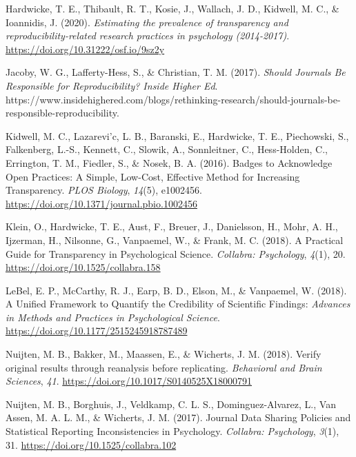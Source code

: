\documentclass[english,,man,floatsintext]{apa6}
\begin{document}
\leavevmode\hypertarget{ref-hardwicke2020a}{}%
Hardwicke, T. E., Thibault, R. T., Kosie, J., Wallach, J. D., Kidwell, M. C., \& Ioannidis, J. (2020). \emph{Estimating the prevalence of transparency and reproducibility-related research practices in psychology (2014-2017)}. \url{https://doi.org/10.31222/osf.io/9sz2y}

\leavevmode\hypertarget{ref-jacoby2017}{}%
Jacoby, W. G., Lafferty-Hess, S., \& Christian, T. M. (2017). \emph{Should Journals Be Responsible for Reproducibility? \textbar{} Inside Higher Ed}. https://www.insidehighered.com/blogs/rethinking-research/should-journals-be-responsible-reproducibility.

\leavevmode\hypertarget{ref-kidwell2016}{}%
Kidwell, M. C., Lazarevi\a'c, L. B., Baranski, E., Hardwicke, T. E., Piechowski, S., Falkenberg, L.-S., Kennett, C., Slowik, A., Sonnleitner, C., Hess-Holden, C., Errington, T. M., Fiedler, S., \& Nosek, B. A. (2016). Badges to Acknowledge Open Practices: A Simple, Low-Cost, Effective Method for Increasing Transparency. \emph{PLOS Biology}, \emph{14}(5), e1002456. \url{https://doi.org/10.1371/journal.pbio.1002456}

\leavevmode\hypertarget{ref-klein2018}{}%
Klein, O., Hardwicke, T. E., Aust, F., Breuer, J., Danielsson, H., Mohr, A. H., Ijzerman, H., Nilsonne, G., Vanpaemel, W., \& Frank, M. C. (2018). A Practical Guide for Transparency in Psychological Science. \emph{Collabra: Psychology}, \emph{4}(1), 20. \url{https://doi.org/10.1525/collabra.158}

\leavevmode\hypertarget{ref-lebel2018}{}%
LeBel, E. P., McCarthy, R. J., Earp, B. D., Elson, M., \& Vanpaemel, W. (2018). A Unified Framework to Quantify the Credibility of Scientific Findings: \emph{Advances in Methods and Practices in Psychological Science}. \url{https://doi.org/10.1177/2515245918787489}

\leavevmode\hypertarget{ref-nuijten2018}{}%
Nuijten, M. B., Bakker, M., Maassen, E., \& Wicherts, J. M. (2018). Verify original results through reanalysis before replicating. \emph{Behavioral and Brain Sciences}, \emph{41}. \url{https://doi.org/10.1017/S0140525X18000791}

\leavevmode\hypertarget{ref-nuijten2017}{}%
Nuijten, M. B., Borghuis, J., Veldkamp, C. L. S., Dominguez-Alvarez, L., Van Assen, M. A. L. M., \& Wicherts, J. M. (2017). Journal Data Sharing Policies and Statistical Reporting Inconsistencies in Psychology. \emph{Collabra: Psychology}, \emph{3}(1), 31. \url{https://doi.org/10.1525/collabra.102}
\end{document}
